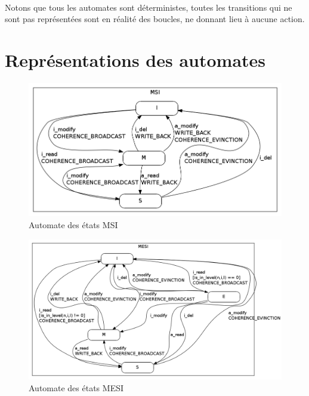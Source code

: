 \paragraph{}
Notons que tous les automates sont déterministes, toutes les transitions qui ne sont pas représentées sont en réalité des boucles, ne donnant lieu à aucune action.


\section{Représentations des automates}
\label{aut}

\begin{figure}[!h]
\begin{center}
   \includegraphics[scale=0.45]{images/MSI_simple.png}
   \caption{\label{img:state_msi} Automate des états MSI}
\end{center}
\end{figure}


\begin{figure}[!h]
\begin{center}
   \includegraphics[scale=0.4]{images/MESI_simple.png}
   \caption{\label{img:state_mesi} Automate des états MESI}
\end{center}
\end{figure}



